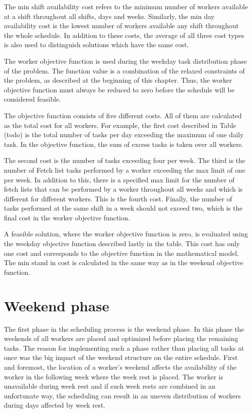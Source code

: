 The min shift availability cost refers to the minimum number of workers available at a shift throughout all shifts, days and weeks. Similarly, the min day availability cost is the lowest number of workers available any shift throughout the whole schedule. In addition to these costs, the average of all three cost types is also used to distinguish solutions which have the same cost.

The worker objective function is used during the weekday task distribution phase of the problem. The function value is a combination of the relaxed constraints of the problem, as described at the beginning of this chapter. Thus, the worker objective function must always be reduced to zero before the schedule will be considered feasible.

The objective function consists of five different costs. All of them are calculated as the total cost for all workers. For example, the first cost described in Table (todo) is the total number of tasks per day exceeding the maximum of one daily task. In the objective function, the sum of excess tasks is taken over all workers. 

The second cost is the number of tasks exceeding four per week. The third is the number of Fetch list tasks performed by a worker exceeding the max limit of one per week. In addition to this, there is a specified max limit for the number of fetch lists that can be performed by a worker throughout all weeks and which is different for different workers. This is the fourth cost. Finally, the number of tasks performed at the same shift in a week should not exceed two, which is the final cost in the worker objective function.

A feasible solution, where the worker objective function is zero, is evaluated using the weekday objective function described lastly in the table. This cost has only one cost and corresponds to the objective function in the mathematical model. The min stand in cost is calculated in the same way as in the weekend objective function. 

\section{Weekend phase}

The first phase in the scheduling process is the weekend phase. In this phase the weekends of all workers are placed and optimized before placing the remaining tasks. The reason for implementing such a phase rather than placing all tasks at once was the big impact of the weekend structure on the entire schedule. First and foremost, the location of a worker's weekend affects the availability of the worker in the following week where the week rest is placed. The worker is unavailable during week rest and if such week rests are combined in an unfortunate way, the scheduling can result in an uneven distribution of workers during days affected by week rest.

